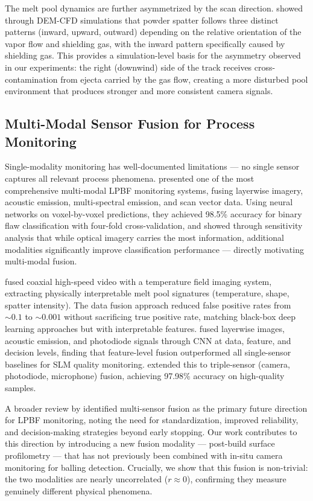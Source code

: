 The melt pool dynamics are further asymmetrized by the scan
direction. \citet{yuan2023revealing} showed through
DEM-CFD simulations that powder spatter follows three distinct
patterns (inward, upward, outward) depending on the relative
orientation of the vapor flow and shielding gas, with the
inward pattern specifically caused by shielding gas. This
provides a simulation-level basis for the asymmetry observed
in our experiments: the right (downwind) side of the track
receives cross-contamination from ejecta carried by the gas
flow, creating a more disturbed pool environment that produces
stronger and more consistent camera signals.

\subsection{Multi-Modal Sensor Fusion for Process Monitoring}

Single-modality monitoring has well-documented limitations —
no single sensor captures all relevant process phenomena.
\citet{petrich2021multimodal} presented one of the most
comprehensive multi-modal LPBF monitoring systems, fusing
layerwise imagery, acoustic emission, multi-spectral emission,
and scan vector data. Using neural networks on voxel-by-voxel
predictions, they achieved 98.5\% accuracy for binary flaw
classification with four-fold cross-validation, and showed
through sensitivity analysis that while optical imagery carries
the most information, additional modalities significantly improve
classification performance — directly motivating multi-modal
fusion.

\citet{gaikwad2022multi} fused coaxial high-speed video with
a temperature field imaging system, extracting physically
interpretable melt pool signatures (temperature, shape, spatter
intensity). The data fusion approach reduced false positive
rates from $\sim 0.1$ to $\sim 0.001$ without sacrificing
true positive rate, matching black-box deep learning approaches
but with interpretable features.
\citet{li2022convolutional} fused layerwise images, acoustic
emission, and photodiode signals through CNN at data, feature,
and decision levels, finding that feature-level fusion
outperformed all single-sensor baselines for SLM quality
monitoring. \citet{wu2024insitu} extended this to triple-sensor
(camera, photodiode, microphone) fusion, achieving 97.98\%
accuracy on high-quality samples.

A broader review by \citet{chen2024insitu} identified multi-sensor
fusion as the primary future direction for LPBF monitoring,
noting the need for standardization, improved reliability,
and decision-making strategies beyond early stopping. Our work
contributes to this direction by introducing a new fusion
modality — post-build surface profilometry — that has not
previously been combined with in-situ camera monitoring for
balling detection. Crucially, we show that this fusion is
non-trivial: the two modalities are nearly uncorrelated
($r \approx 0$), confirming they measure genuinely different
physical phenomena.

